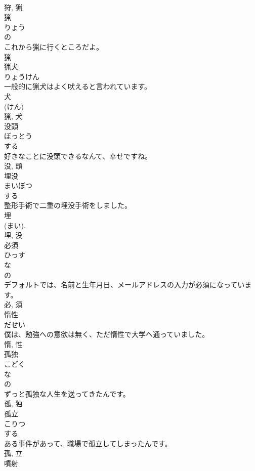 \documentclass[8pt]{extreport}
\begin{document}
\begin{CJK}{UTF8}{min}
\\	狩, 猟	
\\	猟	
\\	りょう	
\\	の 
\\	これから猟に行くところだよ。	
\\	猟	
\\	猟犬	
\\	りょうけん	
\\	一般的に猟犬はよく吠えると言われています。	
\\	犬 
\\	(けん) 
\\	猟, 犬	
\\	没頭	
\\	ぼっとう	
\\	する 
\\	好きなことに没頭できるなんて、幸せですね。	
\\	没, 頭	
\\	埋没	
\\	まいぼつ	
\\	する 
\\	整形手術で二重の埋没手術をしました。	
\\	埋 
\\	(まい). 
\\	埋, 没	
\\	必須	
\\	ひっす	
\\	な 
\\	の 
\\	デフォルトでは、名前と生年月日、メールアドレスの入力が必須になっています。	
\\	必, 須	
\\	惰性	
\\	だせい	
\\	僕は、勉強への意欲は無く、ただ惰性で大学へ通っていました。	
\\	惰, 性	
\\	孤独	
\\	こどく	
\\	な 
\\	の 
\\	ずっと孤独な人生を送ってきたんです。	
\\	孤, 独	
\\	孤立	
\\	こりつ	
\\	する 
\\	ある事件があって、職場で孤立してしまったんです。	
\\	孤, 立	
\\	噴射	

\end{CJK}
\end{document}
